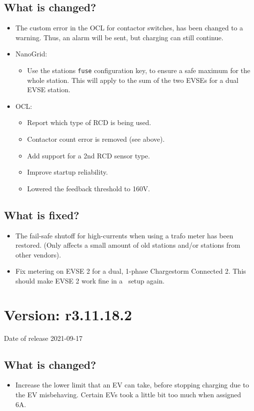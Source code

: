 \documentclass{scrartcl}
\begin{document}
\subsection*{What is changed?}
\begin{itemize}
\item The custom error in the OCL for contactor switches, has been changed to
  a warning. Thus, an alarm will be sent, but charging can still continue.
\item NanoGrid:
  \begin{itemize}
  \item Use the stations \verb|fuse| configuration key, to ensure a safe
    maximum for the whole station. This will apply to the sum of the two EVSEs
    for a dual EVSE station.
  \end{itemize}
\item OCL:
  \begin{itemize}
  \item Report which type of RCD is being used.
  \item Contactor count error is removed (see above).
  \item Add support for a 2nd RCD sensor type.
  \item Improve startup reliability.
  \item Lowered the feedback threshold to 160V.
  \end{itemize}
\end{itemize}
\subsection*{What is fixed?}
\begin{itemize}
\item The fail-safe shutoff for high-currents when using a trafo meter has
  been restored. (Only affects a small amount of old stations and/or stations
  from other vendors).
\item Fix metering on EVSE 2 for a dual, 1-phase Chargestorm Connected 2. This
  should make EVSE 2 work fine in a \nanogrid\ setup again.
\end{itemize}

\section{Version: r3.11.18.2}

Date of release 2021-09-17
\subsection*{What is changed?}
\begin{itemize}
\item Increase the lower limit that an EV can take, before stopping charging
  due to the EV misbehaving. Certain EVs took a little bit too much when
  assigned 6A.
\end{itemize}
\end{document}
